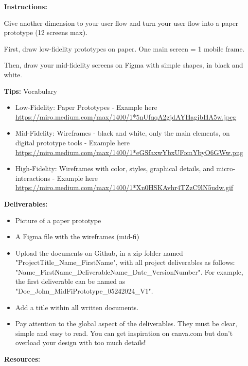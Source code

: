 \makeheaderfiles

\textbf{Instructions:}

Give another dimension to your user flow and turn your user flow into a paper prototype (12 screens max).

First, draw low-fidelity prototypes on paper. One main screen = 1 mobile frame.

Then, draw your mid-fidelity screens on Figma with simple shapes, in black and white.

\textbf{Tips:} Vocabulary

\begin{itemize}
\item Low-Fidelity: Paper Prototypes - Example here \url{https://miro.medium.com/max/1400/1*5nUfqqA2gjdAYHagjbHA5w.jpeg}
\item Mid-Fidelity: Wireframes - black and white, only the main elements, on digital prototype tools - Example here \url{https://miro.medium.com/max/1400/1*eGSfaxwYbxUFomYbyO6GWw.png}
\item High-Fidelity: Wireframes with color, styles, graphical details, and micro-interactions - Example here \url{https://miro.medium.com/max/1400/1*Xn0HSKAvhr4TZzC9lN5udw.gif}
\end{itemize}

\textbf{Deliverables:}

\begin{itemize}
\item Picture of a paper prototype
\item A Figma file with the wireframes (mid-fi)
\item Upload the documents on Github, in a zip folder named "ProjectTitle\_Name\_FirstName", with all project deliverables as follows: "Name\_FirstName\_DeliverableName\_Date\_VersionNumber".  For example, the first deliverable can be named as "Doe\_John\_MidFiPrototype\_05242024\_V1".
\item Add a title within all written documents.
\item Pay attention to the global aspect of the deliverables. They must be clear, simple and easy to read. You can get inspiration on canva.com but don't overload your design with too much details!
\end{itemize}

\textbf{Resources:}


